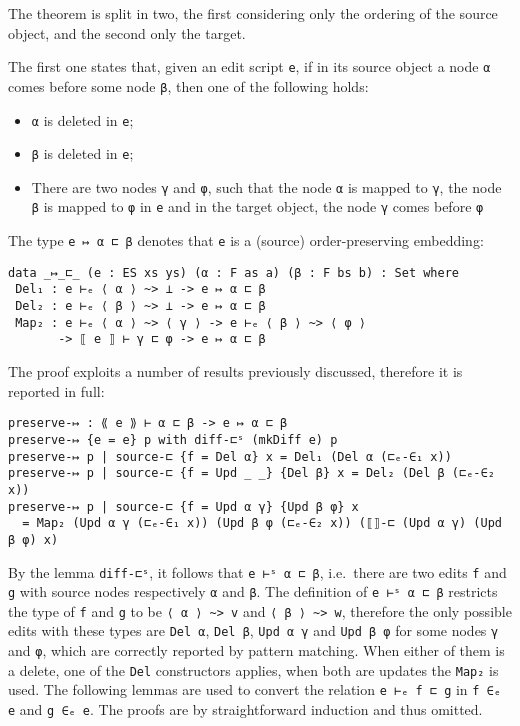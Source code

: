 \documentclass[../Thesis.tex]{subfiles}
\begin{document}
	The theorem is split in two, the first considering only the ordering 
	of the source object, and the second only the target.
	
	The first one states that, given an edit script \texttt{e}, 
	if in its source object a node \texttt{α} comes before
	some node \texttt{β}, then one of the following holds:
\begin{itemize}
	\item \texttt{α} is deleted in \texttt{e};
	\item \texttt{β} is deleted in \texttt{e};
	\item There are two nodes \texttt{γ} and \texttt{φ}, such that the node 
	\texttt{α} is 	mapped to \texttt{γ}, the node \texttt{β} is mapped to 
	\texttt{φ} in \texttt{e} and 
	in the target	object, the node \texttt{γ} comes before \texttt{φ}
\end{itemize}

	The type \texttt{e ↦ α ⊏ β} denotes that \texttt{e} is a (source) 
	order-preserving embedding:
\begin{verbatim}
data _↦_⊏_ (e : ES xs ys) (α : F as a) (β : F bs b) : Set where
 Del₁ : e ⊢ₑ ⟨ α ⟩ ~> ⊥ -> e ↦ α ⊏ β
 Del₂ : e ⊢ₑ ⟨ β ⟩ ~> ⊥ -> e ↦ α ⊏ β
 Map₂ : e ⊢ₑ ⟨ α ⟩ ~> ⟨ γ ⟩ -> e ⊢ₑ ⟨ β ⟩ ~> ⟨ φ ⟩ 
       -> ⟦ e ⟧ ⊢ γ ⊏ φ -> e ↦ α ⊏ β
\end{verbatim}

	The proof exploits a number of results previously discussed,
	therefore it is reported in full:

\begin{verbatim}
preserve-↦ : ⟪ e ⟫ ⊢ α ⊏ β -> e ↦ α ⊏ β
preserve-↦ {e = e} p with diff-⊏ˢ (mkDiff e) p
preserve-↦ p | source-⊏ {f = Del α} x = Del₁ (Del α (⊏ₑ-∈₁ x))
preserve-↦ p | source-⊏ {f = Upd _ _} {Del β} x = Del₂ (Del β (⊏ₑ-∈₂ x))
preserve-↦ p | source-⊏ {f = Upd α γ} {Upd β φ} x 
  = Map₂ (Upd α γ (⊏ₑ-∈₁ x)) (Upd β φ (⊏ₑ-∈₂ x)) (⟦⟧-⊏ (Upd α γ) (Upd β φ) x)
\end{verbatim}

	By the lemma \texttt{diff-⊏ˢ}, it follows that \texttt{e ⊢ˢ α ⊏ β},
	i.e.\ there are two edits \texttt{f} and \texttt{g} with source nodes 
	respectively \texttt{α} and \texttt{β}.
	The definition of \texttt{e ⊢ˢ α ⊏ β} restricts the type of 
	\texttt{f} and \texttt{g} to be \texttt{⟨ α ⟩ \textasciitilde> v} and \texttt{⟨ β ⟩ \textasciitilde> w}, 
	therefore the only possible edits with these types are \texttt{Del α},
	\texttt{Del β}, \texttt{Upd α γ} and \texttt{Upd β φ} for some
	nodes \texttt{γ} and \texttt{φ}, which are
	correctly reported by pattern matching.
	When either of them is a delete, one of the \texttt{Del} constructors applies,
	when both are updates the \texttt{Map₂} is used.
	The following lemmas are used to convert the relation \texttt{e ⊢ₑ f ⊏ g}
	in \texttt{f ∈ₑ e} and \texttt{g ∈ₑ e}.
	The proofs are by straightforward induction and thus omitted.
	
\end{document}
